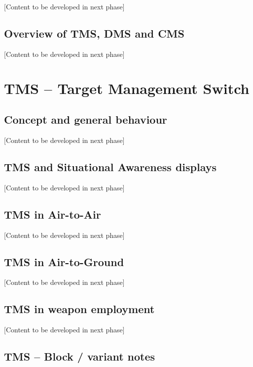 \documentclass[11pt,a4paper]{article}
\begin{document}
[Content to be developed in next phase]

\subsection{Overview of TMS, DMS and CMS}

[Content to be developed in next phase]


\section{TMS -- Target Management Switch}

\subsection{Concept and general behaviour}

[Content to be developed in next phase]

\subsection{TMS and Situational Awareness displays}

[Content to be developed in next phase]

\subsection{TMS in Air-to-Air}

[Content to be developed in next phase]

\subsection{TMS in Air-to-Ground}

[Content to be developed in next phase]

\subsection{TMS in weapon employment}

[Content to be developed in next phase]

\subsection{TMS -- Block / variant notes}
\end{document}

